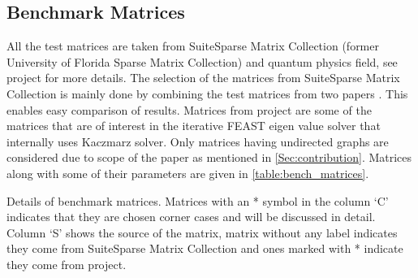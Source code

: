 \subsection{Benchmark Matrices}
All the test matrices are taken from SuiteSparse Matrix Collection (former University of Florida Sparse Matrix Collection) \cite{UOF} and quantum physics field, see \ESSEX project \cite{ESSEX} for more details. The selection of the matrices from SuiteSparse Matrix Collection is  mainly done by combining the test matrices from two papers \cite{RSB,park_ls}. This enables easy comparison of results. Matrices from \ESSEX project are some of the matrices that are of interest in the iterative FEAST eigen value solver that internally uses Kaczmarz solver. Only matrices having undirected graphs are considered due to scope of the paper as mentioned in \cref{Sec:contribution}. Matrices along with some of their parameters are given in \cref{table:bench_matrices}. 
\begin{table}[ht]
	\footnotesize
	\caption{Details of benchmark matrices. Matrices with an * symbol in the column `C' indicates that they are chosen corner cases and will be discussed in detail. Column `S' shows the source of the matrix, matrix without any label indicates they come from SuiteSparse Matrix Collection and ones marked with * indicate they come from \ESSEX project.} \label{tab:test_mtx}
	\label{table:bench_matrices}
	\begin{center}
		
	\end{center}
\end{table}

%		

%		

